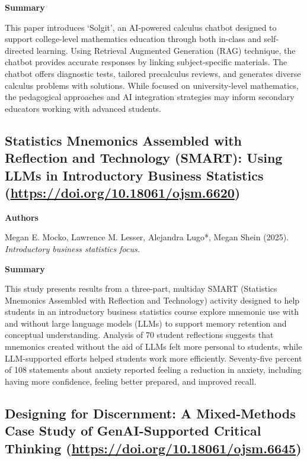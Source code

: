 \documentclass[11pt, a4paper]{article}
\newenvironment{annotation}[1]
{\par\vspace{2pt}\noindent\textbf{#1}\par\vspace{1pt}\noindent\small\ignorespaces}
{\par\vspace{3pt}}
\begin{document}
\begin{annotation}{Summary}
This paper introduces `Solgit', an AI-powered calculus chatbot designed to support college-level mathematics education through both in-class and self-directed learning. Using Retrieval Augmented Generation (RAG) technique, the chatbot provides accurate responses by linking subject-specific materials. The chatbot offers diagnostic tests, tailored precalculus reviews, and generates diverse calculus problems with solutions. While focused on university-level mathematics, the pedagogical approaches and AI integration strategies may inform secondary educators working with advanced students.
\end{annotation}


\subsection{Statistics Mnemonics Assembled with Reflection and Technology (SMART): Using LLMs in Introductory Business Statistics (\url{https://doi.org/10.18061/ojsm.6620})}

\begin{annotation}{Authors}
Megan E. Mocko, Lawrence M. Lesser, Alejandra Lugo*, Megan Shein (2025). \textit{Introductory business statistics focus.}
\end{annotation}

\begin{annotation}{Summary}
This study presents results from a three-part, multiday SMART (Statistics Mnemonics Assembled with Reflection and Technology) activity designed to help students in an introductory business statistics course explore mnemonic use with and without large language models (LLMs) to support memory retention and conceptual understanding. Analysis of 70 student reflections suggests that mnemonics created without the aid of LLMs felt more personal to students, while LLM-supported efforts helped students work more efficiently. Seventy-five percent of 108 statements about anxiety reported feeling a reduction in anxiety, including having more confidence, feeling better prepared, and improved recall.
\end{annotation}


\subsection[\texorpdfstring{Designing for Discernment: A Mixed-Methods Case Study of GenAI-Supported Critical Thinking }{Designing for Discernment: A Mixed-Methods Case Study of GenAI-Supported Critical Thinking }]{Designing for Discernment: A Mixed-Methods Case Study of GenAI-Supported Critical Thinking (\texorpdfstring{\url{https://doi.org/10.18061/ojsm.6645}}{})}
\end{document}
